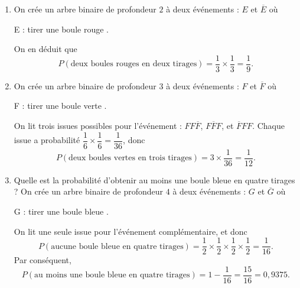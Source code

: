 {	\begin{enumerate}
		\item 
			On crée un arbre binaire de profondeur $2$ à deux événements : $E$ et $\overline{E}$ où
				\begin{center}
					E : \og tirer une boule rouge \fg.
				\end{center}
			On en déduit que
			\[ P(\text{deux boules rouges en deux tirages}) = \dfrac13 \times \dfrac13 = \dfrac19. \]
		\item 
			On crée un arbre binaire de profondeur $3$ à deux événements : $F$ et $\overline{F}$ où
				\begin{center}
					F : \og tirer une boule verte \fg.
				\end{center}
			On lit trois issues possibles pour l'événement : $FF\overline{F}$, $F\overline{F}F$, et $\overline{F}FF$.
			Chaque issue a probabilité $\dfrac16 \times \dfrac16 = \dfrac1{36}$, donc
			\[ P(\text{deux boules vertes en trois tirages}) = 3\times \dfrac1{36} = \dfrac1{12}. \]
		\item Quelle est la probabilité d'obtenir au moins une boule bleue en quatre tirages ?
			On crée un arbre binaire de profondeur $4$ à deux événements : $G$ et $\overline{G}$ où
				\begin{center}
					G : \og tirer une boule bleue \fg.
				\end{center}
			On lit une seule issue pour l'événement complémentaire, et donc
			\[ P(\text{aucune boule bleue en quatre tirages}) = \dfrac12\times\dfrac12\times\dfrac12\times\dfrac12= \dfrac{1}{16}. \]
			Par conséquent, 
			\[ P(\text{au moins une boule bleue en quatre tirages}) =1- \dfrac{1}{16} = \dfrac{15}{16} = 0,9375. \]
	\end{enumerate}
}


